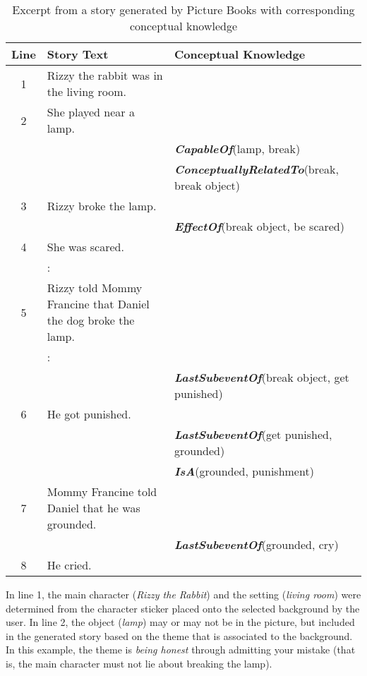 \begin{table}[h]   %
\centering
\caption{Excerpt from a story generated by Picture Books with corresponding conceptual knowledge} \vspace{0.25em}
\begin{tabular}{|c|p{6.5cm}|p{6cm}|} \hline
Line & Story Text & Conceptual Knowledge \\ \hline
1 & Rizzy the rabbit was in the living room. & \\
2 & She played near a lamp. & \\
  &  & \textbf{\emph{CapableOf}}(lamp, break) \\
  &  & \textbf{\emph{ConceptuallyRelatedTo}}(break, break object) \\
3 & Rizzy broke the lamp. & \\
  &  & \textbf{\emph{EffectOf}}(break object, be scared) \\
4 & She was scared. & \\
  & : & \\
5 & Rizzy told Mommy Francine that Daniel the dog broke the lamp. & \\
  & : & \\
  &  & \textbf{\emph{LastSubeventOf}}(break object, get punished) \\
6 & He got punished. & \\
  &  & \textbf{\emph{LastSubeventOf}}(get punished, grounded) \\
  &  & \textbf{\emph{IsA}}(grounded, punishment) \\
7 & Mommy Francine told Daniel that he was grounded. & \\
  &  & \textbf{\emph{LastSubeventOf}}(grounded, cry) \\
8 & He cried. & \\ \hline
\end{tabular}
\label{tab:picturebookexcerpt}
\end{table}

In line 1, the main character (\emph{Rizzy the Rabbit}) and the setting (\emph{living room}) were determined from the character sticker placed onto the selected background by the user. In line 2, the object (\emph{lamp}) may or may not be in the picture, but included in the generated story based on the theme that is associated to the background. In this example, the theme is \emph{being honest} through admitting your mistake (that is, the main character must not lie about breaking the lamp).

